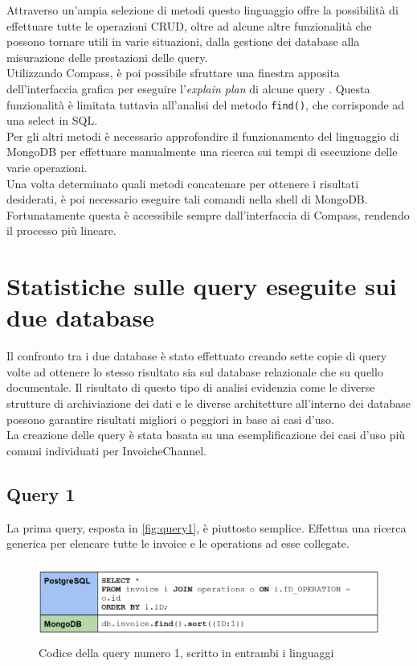 \noindent Attraverso un'ampia selezione di metodi questo linguaggio offre la possibilità di effettuare tutte le \gls{operazioni CRUD}, oltre ad alcune altre funzionalità che possono tornare utili in varie situazioni, dalla gestione dei database alla misurazione delle prestazioni delle query.\\
Utilizzando Compass, è poi possibile sfruttare una finestra apposita dell'interfaccia grafica per eseguire l'\textit{explain plan} di alcune query \cite{site:mongodbcompass}. Questa funzionalità è limitata tuttavia all'analisi del metodo \texttt{find()}, che corrisponde ad una select in \gls{SQL}.\\
Per gli altri metodi è necessario approfondire il funzionamento del linguaggio di MongoDB per effettuare manualmente una ricerca sui tempi di esecuzione delle varie operazioni.\\
Una volta determinato quali metodi concatenare per ottenere i risultati desiderati, è poi necessario eseguire tali comandi nella shell di MongoDB. Fortunatamente questa è accessibile sempre dall'interfaccia di Compass, rendendo il processo più lineare.\\


\section{Statistiche sulle query eseguite sui due database}
Il confronto tra i due database è stato effettuato creando sette copie di query volte ad ottenere lo stesso risultato sia sul database relazionale che su quello documentale. Il risultato di questo tipo di analisi evidenzia come le diverse strutture di archiviazione dei dati e le diverse architetture all'interno dei database possono garantire risultati migliori o peggiori in base ai casi d'uso.\\
La creazione delle query è stata basata su una esemplificazione dei casi d'uso più comuni individuati per InvoicheChannel.

\subsection{Query 1}
La prima query, esposta in \autoref{fig:query1}, è piuttosto semplice. Effettua una ricerca generica per elencare tutte le invoice e le operations ad esse collegate.\\

\begin{figure}[htbp]
\begin{center}
\includegraphics[height=7em]{immagini/query/query1.png}
\caption{Codice della query numero 1, scritto in entrambi i linguaggi}
\label{fig:query1}
\end{center}
\end{figure}

